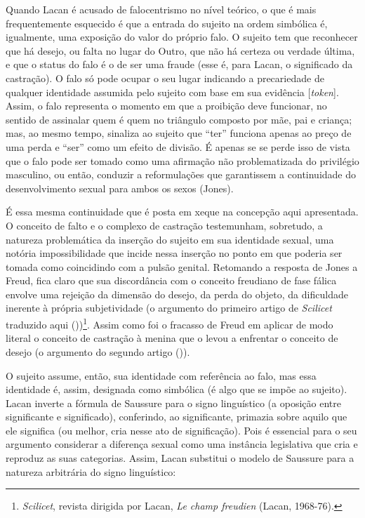 Quando Lacan é acusado de falocentrismo no nível teórico, o que é mais
frequentemente esquecido é que a entrada do sujeito na ordem simbólica
é, igualmente, uma exposição do valor do próprio falo. O sujeito tem que
reconhecer que há desejo, ou falta no lugar do Outro, que não há certeza
ou verdade última, e que o status do falo é o de ser uma fraude (esse é,
para Lacan, o significado da castração). O falo só pode ocupar o seu
lugar indicando a precariedade de qualquer identidade assumida pelo
sujeito com base em sua evidência {[}\emph{token}{]}. Assim, o falo
representa o momento em que a proibição deve funcionar, no sentido de
assinalar quem é quem no triângulo composto por mãe, pai e criança; mas,
ao mesmo tempo, sinaliza ao sujeito que ``ter'' funciona apenas ao preço
de uma perda e ``ser'' como um efeito de divisão. É apenas se se perde
isso de vista que o falo pode ser tomado como uma afirmação não
problematizada do privilégio masculino, ou então, conduzir a
reformulações que garantissem a continuidade do desenvolvimento sexual
para ambos os sexos (Jones).

É essa mesma continuidade que é posta em xeque na concepção aqui
apresentada. O conceito de falto e o complexo de castração testemunham,
sobretudo, a natureza problemática da inserção do sujeito em sua
identidade sexual, uma notória impossibilidade que incide nessa inserção
no ponto em que poderia ser tomada como coincidindo com a pulsão
genital. Retomando a resposta de Jones a Freud, fica claro que sua
discordância com o conceito freudiano de fase fálica envolve uma
rejeição da dimensão do desejo, da perda do objeto, da dificuldade
inerente à própria subjetividade (o argumento do primeiro artigo de
\emph{Scilicet} traduzido aqui ())\footnote{\emph{Scilicet}, revista
  dirigida por Lacan, \emph{Le champ freudien} (Lacan, 1968-76).}. Assim
como foi o fracasso de Freud em aplicar de modo literal o conceito de
castração à menina que o levou a enfrentar o conceito de desejo (o
argumento do segundo artigo ()).

O sujeito assume, então, sua identidade com referência ao falo, mas essa
identidade é, assim, designada como simbólica (é algo que se impõe ao
sujeito). Lacan inverte a fórmula de Saussure para o signo linguístico
(a oposição entre significante e significado), conferindo, ao
significante, primazia sobre aquilo que ele significa (ou melhor, cria
nesse ato de significação). Pois é essencial para o seu argumento
considerar a diferença sexual como uma instância legislativa que cria e
reproduz as suas categorias. Assim, Lacan substitui o modelo de Saussure
para a natureza arbitrária do signo linguístico:

